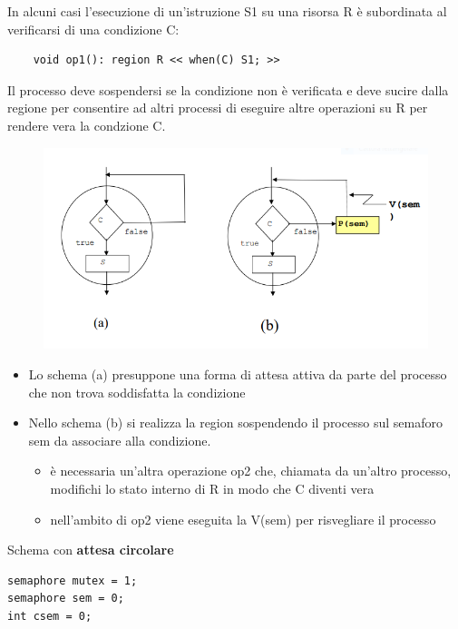 \documentclass{article}
\begin{document}
\vspace{3mm}
In alcuni casi l'esecuzione di un'istruzione S1 su una risorsa R è subordinata al verificarsi di una condizione C:

\begin{lstlisting}
    void op1(): region R << when(C) S1; >>
\end{lstlisting}

\vspace{3mm}
Il processo deve sospendersi se la condizione non è verificata e deve sucire dalla regione per consentire ad altri processi di eseguire altre operazioni su R
per rendere vera la condzione C.

\begin{figure}[htbp]
    \centering
    \includegraphics[width=0.70\columnwidth]{imgs/schema_condizione.PNG}
\end{figure}

\begin{itemize}
    \item Lo schema (a) presuppone una forma di attesa attiva da parte del processo che non trova soddisfatta la condizione
    \item Nello schema (b) si realizza la region sospendendo il processo sul semaforo sem da associare alla condizione.
    \begin{itemize}
        \item è necessaria un'altra operazione op2 che, chiamata da un'altro processo, modifichi lo stato interno di R in modo che C diventi vera
        \item nell'ambito di op2 viene eseguita la V(sem) per risvegliare il processo
    \end{itemize}
\end{itemize}

\vspace{3mm}
Schema con \textbf{attesa circolare}

\begin{lstlisting}
semaphore mutex = 1;
semaphore sem = 0;
int csem = 0;
\end{lstlisting}
\end{document}

